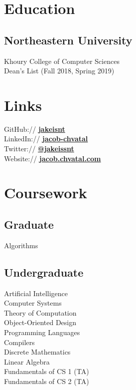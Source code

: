 \documentclass[letterpaper]{cv} %
\begin{document}
\begin{minipage}[t]{0.33\textwidth} %

  \section{Education}
  \subsection{Northeastern University}
  Khoury College of Computer Sciences \\
  Dean's List (Fall 2018, Spring 2019) \\
  \sectionspace %

  \section{Links}
  GitHub:// \href{https://github.com/jakeisnt}{\bf jakeisnt} \\
  LinkedIn:// \href{https://www.linkedin.com/in/jacob-chvatal}{\bf jacob-chvatal} \\
  Twitter:// \href{https://twitter.com/jakeissnt}{\bf @jakeissnt} \\
  Website:// \href{https://wiki.chvatal.com}{\bf jacob.chvatal.com} \\
  \sectionspace

  \section{Coursework}
  \subsection{Graduate}
  Algorithms
  \sectionspace

  \subsection{Undergraduate}
  Artificial Intelligence \\
  Computer Systems \\
  Theory of Computation \\
  Object-Oriented Design \\
  Programming Languages \\
  Compilers \\
  Discrete Mathematics \\
  Linear Algebra \\
  Fundamentals of CS 1 (TA) \\
  Fundamentals of CS 2 (TA) \\


\end{minipage}
\end{document}
